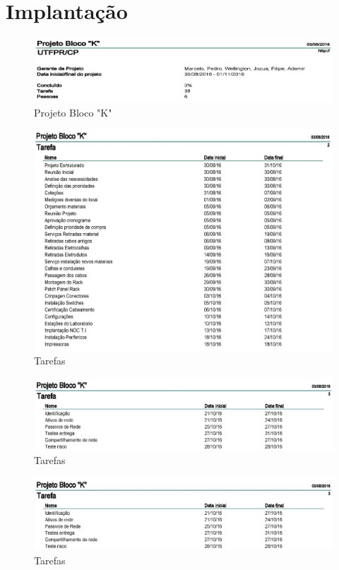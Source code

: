 \documentclass[	DIV=calc,%
							paper=a4,%
							fontsize=12pt,%
							onecolumn]{scrartcl}	 					%
\begin{document}
\section{Implantação}
\begin{figure}[!h]
	\centering
	\caption{Projeto Bloco "K"}
	\includegraphics{a1}
\end{figure}
\begin{figure}[!h]
	\centering
	\caption{Tarefas}
	\includegraphics{a2}
\end{figure}
\begin{figure}[!h]
	\centering
	\caption{Tarefas}
	\includegraphics{a3}
\end{figure}
\begin{figure}[!h]
	\centering
	\caption{Tarefas}
	\includegraphics{a3}
\end{figure}
\end{document}
